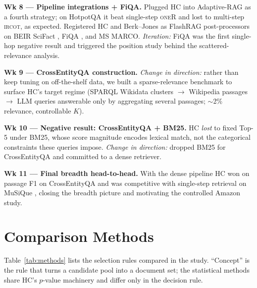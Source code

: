 \documentclass[letterpaper]{article} %
\begin{document}
\textbf{Wk 8 --- Pipeline integrations + FiQA.} Plugged HC into Adaptive-RAG as a fourth strategy; on HotpotQA it beat single-step \textsc{oneR} and lost to multi-step \textsc{ircot}, as expected. Registered HC and Berk--Jones \citep{berkjones1979} as FlashRAG post-processors on BEIR SciFact \citep{thakur2021beir,wadden2020scifact}, FiQA \citep{thakur2021beir}, and MS MARCO. \emph{Iteration:} FiQA was the first single-hop negative result and triggered the position study behind the scattered-relevance analysis.

\textbf{Wk 9 --- CrossEntityQA construction.} \emph{Change in direction:} rather than keep tuning on off-the-shelf data, we built a sparse-relevance benchmark to surface HC's target regime (SPARQL Wikidata clusters $\to$ Wikipedia passages $\to$ LLM queries answerable only by aggregating several passages; $\sim$2\% relevance, controllable $K$).

\textbf{Wk 10 --- Negative result: CrossEntityQA + BM25.} HC \emph{lost} to fixed Top-5 under BM25, whose score magnitude encodes lexical match, not the categorical constraints these queries impose. \emph{Change in direction:} dropped BM25 for CrossEntityQA and committed to a dense retriever.

\textbf{Wk 11 --- Final breadth head-to-head.} With the dense pipeline HC won on passage F1 on CrossEntityQA and was competitive with single-step retrieval on MuSiQue \citep{trivedi2022musique}, closing the breadth picture and motivating the controlled Amazon study.

\normalsize

\section{Comparison Methods}
\label{app:methods}
Table~\ref{tab:methods} lists the selection rules compared in the study.
``Concept'' is the rule that turns a candidate pool into a document set;
the statistical methods share HC's $p$-value machinery and differ only in
the decision rule.
\end{document}

